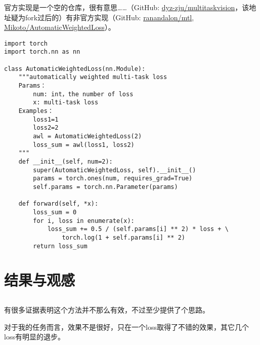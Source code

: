 \documentclass{ctexart}
\begin{document}
官方实现是一个空的仓库，很有意思……（GitHub: \href{https://github.com/dyz-zju/multitaskvision}{dyz-zju/multitaskvision}，该地址疑为fork过后的）有非官方实现（GitHub: \href{https://github.com/ranandalon/mtl}{ranandalon/mtl}, \href{https://github.com/Mikoto10032/AutomaticWeightedLoss}{Mikoto/Automatic\-Weighted\-Loss}）。

\begin{verbatim}
import torch
import torch.nn as nn

class AutomaticWeightedLoss(nn.Module):
    """automatically weighted multi-task loss
    Params：
        num: int，the number of loss
        x: multi-task loss
    Examples：
        loss1=1
        loss2=2
        awl = AutomaticWeightedLoss(2)
        loss_sum = awl(loss1, loss2)
    """
    def __init__(self, num=2):
        super(AutomaticWeightedLoss, self).__init__()
        params = torch.ones(num, requires_grad=True)
        self.params = torch.nn.Parameter(params)

    def forward(self, *x):
        loss_sum = 0
        for i, loss in enumerate(x):
            loss_sum += 0.5 / (self.params[i] ** 2) * loss + \
                torch.log(1 + self.params[i] ** 2)
        return loss_sum
\end{verbatim}


\section{结果与观感}

\subsection{}

有很多证据表明这个方法并不那么有效，不过至少提供了个思路。

对于我的任务而言，效果不是很好，只在一个loss取得了不错的效果，其它几个loss有明显的退步。


\end{document}
